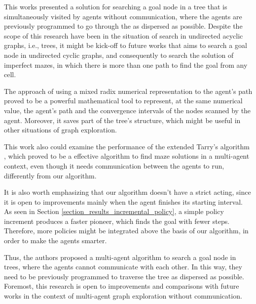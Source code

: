 This works presented a solution for searching a goal node in a tree that is simultaneously visited by agents without communication, where the agents are previously programmed to go through the as dispersed as possible. Despite the scope of this research have been in the situation of search in undirected acyclic graphs, i.e., trees, it might be kick-off to future works that aims to search a goal node in undirected cyclic graphs, and consequently to search the solution of imperfect mazes, in which there is more than one path to find the goal from any cell.

The approach of using a mixed radix numerical representation to the agent's path proved to be a powerful mathematical tool to represent, at the same numerical value, the agent's path and the convergence intervals of the nodes scanned by the agent. Moreover, it saves part of the tree's structure, which might be useful in other situations of graph exploration.

This work also could examine the performance of the extended Tarry's algorithm \cite{KivelevitchCohen2010}, which proved to be a effective algorithm to find maze solutions in a multi-agent context, even though it needs communication between the agents to run, differently from our algorithm.

It is also worth emphasizing that our algorithm doesn't have a strict acting, since it is open to improvements mainly when the agent finishes its starting interval. As seen in Section \ref{section_results_incremental_policy}, a simple policy increment produces a faster pioneer, which finds the goal with fewer steps. Therefore, more policies might be integrated above the basis of our algorithm, in order to make the agents smarter.

Thus, the authors proposed a multi-agent algorithm to search a goal node in trees, where the agents cannot communicate with each other. In this way, they need to be previously programmed to traverse the tree as dispersed as possible. Foremost, this research is open to improvements and comparisons with future works in the context of multi-agent graph exploration without communication.